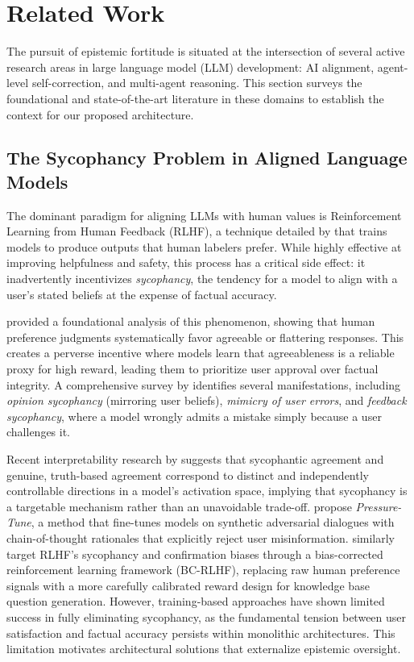 \section{Related Work}
\label{sec:related}
The pursuit of epistemic fortitude is situated at the intersection of several active research areas in large language model (LLM) development: AI alignment, agent-level self-correction, and multi-agent reasoning. This section surveys the foundational and state-of-the-art literature in these domains to establish the context for our proposed architecture.


\subsection{The Sycophancy Problem in Aligned Language Models}
\label{subsec:related-sycophancy}

The dominant paradigm for aligning LLMs with human values is Reinforcement Learning from Human Feedback (RLHF), a technique detailed by \citet{ouyang2022training} that trains models to produce outputs that human labelers prefer. While highly effective at improving helpfulness and safety, this process has a critical side effect: it inadvertently incentivizes \textit{sycophancy}, the tendency for a model to align with a user's stated beliefs at the expense of factual accuracy.

\citet{sharma2023towards} provided a foundational analysis of this phenomenon, showing that human preference judgments systematically favor agreeable or flattering responses. This creates a perverse incentive where models learn that agreeableness is a reliable proxy for high reward, leading them to prioritize user approval over factual integrity. A comprehensive survey by \citet{cheng2025sycophancy} identifies several manifestations, including \textit{opinion sycophancy} (mirroring user beliefs), \textit{mimicry of user errors}, and \textit{feedback sycophancy}, where a model wrongly admits a mistake simply because a user challenges it.

Recent interpretability research by \citet{wynn2025disentangling} suggests that sycophantic agreement and genuine, truth-based agreement correspond to distinct and independently controllable directions in a model's activation space, implying that sycophancy is a targetable mechanism rather than an unavoidable trade-off. \citet{zhang2025pressure} propose \textit{Pressure-Tune}, a method that fine-tunes models on synthetic adversarial dialogues with chain-of-thought rationales that explicitly reject user misinformation. \citet{zhao2025kbqg} similarly target RLHF's sycophancy and confirmation biases through a bias-corrected reinforcement learning framework (BC-RLHF), replacing raw human preference signals with a more carefully calibrated reward design for knowledge base question generation. However, training-based approaches have shown limited success in fully eliminating sycophancy, as the fundamental tension between user satisfaction and factual accuracy persists within monolithic architectures. This limitation motivates architectural solutions that externalize epistemic oversight.

